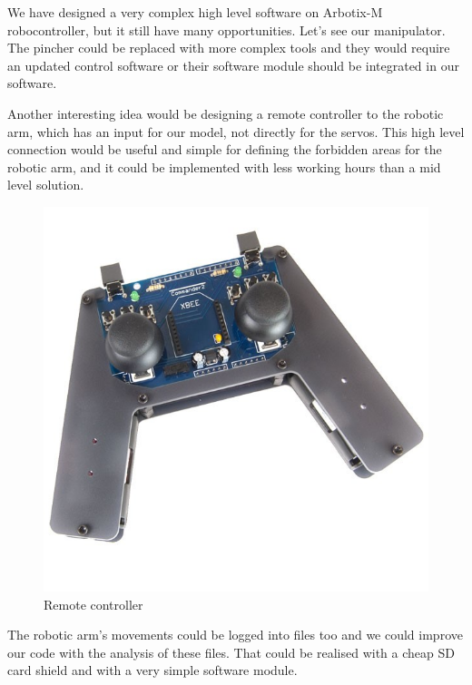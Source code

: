 		\hspace{15pt}We have designed a very complex high level software on Arbotix-M robocontroller, but it still have many opportunities. Let’s see our manipulator. The pincher could be replaced with more complex tools and they would require an updated control software or their software module should be integrated in our software.
		
		Another interesting idea would be designing a remote controller to the robotic arm, which has an input for our model, not directly for the servos. This high level connection would be useful and simple for defining the forbidden areas for the robotic arm, and it could be implemented with less working hours than a mid level solution.
		
		\begin{figure}[H]
			\centering
			\includegraphics[scale=0.6]{./images/remote_controller}
			\caption{Remote controller\cite{gamepad}}
		\end{figure}
		
		The robotic arm’s movements could be logged into files too and we could improve our code with the analysis of these files. That could be realised with a cheap SD card shield and with a very simple software module.
		
